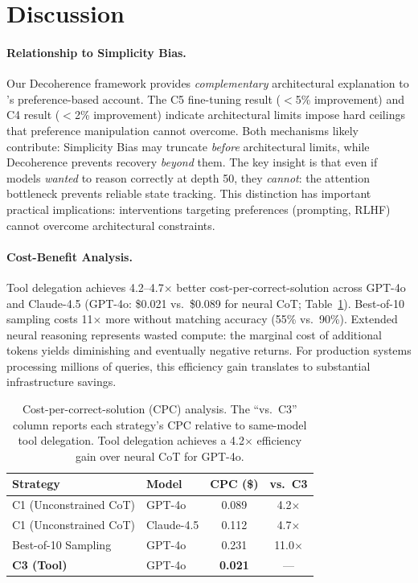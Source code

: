 \documentclass{article}
\theoremstyle{plain}
\theoremstyle{definition}
\theoremstyle{remark}
\begin{document}

\section{Discussion}
\label{sec:discussion}

\paragraph{Relationship to Simplicity Bias.} Our Decoherence framework provides \emph{complementary} architectural explanation to \citet{wu2025more}'s preference-based account. The C5 fine-tuning result ($<$5\% improvement) and C4 result ($<$2\% improvement) indicate architectural limits impose hard ceilings that preference manipulation cannot overcome. Both mechanisms likely contribute: Simplicity Bias may truncate \emph{before} architectural limits, while Decoherence prevents recovery \emph{beyond} them. The key insight is that even if models \emph{wanted} to reason correctly at depth 50, they \emph{cannot}: the attention bottleneck prevents reliable state tracking. This distinction has important practical implications: interventions targeting preferences (prompting, RLHF) cannot overcome architectural constraints.

\paragraph{Cost-Benefit Analysis.} Tool delegation achieves 4.2--4.7$\times$ better cost-per-correct-solution across GPT-4o and Claude-4.5 (GPT-4o: \$0.021 vs.\ \$0.089 for neural CoT; Table~\ref{tab:cost_main}). Best-of-10 sampling costs 11$\times$ more without matching accuracy (55\% vs.\ 90\%). Extended neural reasoning represents wasted compute: the marginal cost of additional tokens yields diminishing and eventually negative returns. For production systems processing millions of queries, this efficiency gain translates to substantial infrastructure savings.

\begin{table}[t]
\caption{Cost-per-correct-solution (CPC) analysis. The ``vs.\ C3'' column reports each strategy's CPC relative to same-model tool delegation. Tool delegation achieves a 4.2$\times$ efficiency gain over neural CoT for GPT-4o.}
\label{tab:cost_main}
\vskip 0.1in
\centering
\footnotesize
\begin{tabular}{@{}llcc@{}}
\toprule
\textbf{Strategy} & \textbf{Model} & \textbf{CPC (\$)} & \textbf{vs.\ C3} \\
\midrule
C1 (Unconstrained CoT) & GPT-4o & 0.089 & 4.2$\times$ \\
C1 (Unconstrained CoT) & Claude-4.5 & 0.112 & 4.7$\times$ \\
Best-of-10 Sampling & GPT-4o & 0.231 & 11.0$\times$ \\
\textbf{C3 (Tool)} & GPT-4o & \textbf{0.021} & --- \\
\bottomrule
\end{tabular}
\vskip -0.1in
\end{table}
\end{document}
